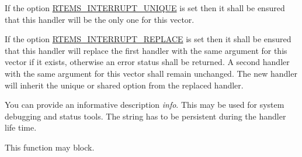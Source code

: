 If the option \mbox{\hyperlink{group__rtems__interrupt__extension_ga5f61e9433b266894801af5ed9992efac}{R\+T\+E\+M\+S\+\_\+\+I\+N\+T\+E\+R\+R\+U\+P\+T\+\_\+\+U\+N\+I\+Q\+UE}} is set then it shall be ensured that this handler will be the only one for this vector.

If the option \mbox{\hyperlink{group__rtems__interrupt__extension_gaca2eb7f8caa5eda72bd6924ee4c8e5d3}{R\+T\+E\+M\+S\+\_\+\+I\+N\+T\+E\+R\+R\+U\+P\+T\+\_\+\+R\+E\+P\+L\+A\+CE}} is set then it shall be ensured that this handler will replace the first handler with the same argument for this vector if it exists, otherwise an error status shall be returned. A second handler with the same argument for this vector shall remain unchanged. The new handler will inherit the unique or shared option from the replaced handler.

You can provide an informative description {\itshape info}. This may be used for system debugging and status tools. The string has to be persistent during the handler life time.

This function may block.


